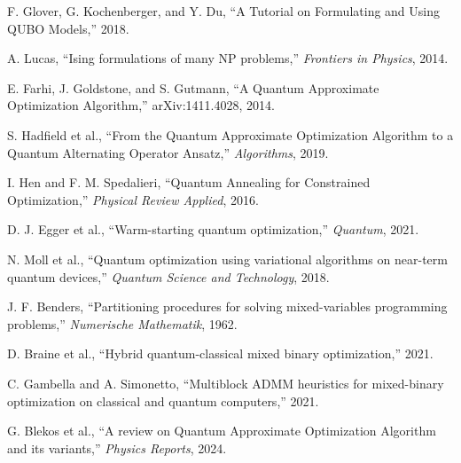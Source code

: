 \documentclass[UTF8,a4paper,11pt]{ctexart}
\begin{document}
\begin{enumerate}[label={[\arabic*]},leftmargin=2.2em]
  \item F. Glover, G. Kochenberger, and Y. Du, ``A Tutorial on Formulating and Using QUBO Models,'' 2018.
  \item A. Lucas, ``Ising formulations of many NP problems,'' \textit{Frontiers in Physics}, 2014.
  \item E. Farhi, J. Goldstone, and S. Gutmann, ``A Quantum Approximate Optimization Algorithm,'' arXiv:1411.4028, 2014.
  \item S. Hadfield et al., ``From the Quantum Approximate Optimization Algorithm to a Quantum Alternating Operator Ansatz,'' \textit{Algorithms}, 2019.
  \item I. Hen and F. M. Spedalieri, ``Quantum Annealing for Constrained Optimization,'' \textit{Physical Review Applied}, 2016.
  \item D. J. Egger et al., ``Warm-starting quantum optimization,'' \textit{Quantum}, 2021.
  \item N. Moll et al., ``Quantum optimization using variational algorithms on near-term quantum devices,'' \textit{Quantum Science and Technology}, 2018.
  \item J. F. Benders, ``Partitioning procedures for solving mixed-variables programming problems,'' \textit{Numerische Mathematik}, 1962.
  \item D. Braine et al., ``Hybrid quantum-classical mixed binary optimization,'' 2021.
  \item C. Gambella and A. Simonetto, ``Multiblock ADMM heuristics for mixed-binary optimization on classical and quantum computers,'' 2021.
  \item G. Blekos et al., ``A review on Quantum Approximate Optimization Algorithm and its variants,'' \textit{Physics Reports}, 2024.
\end{enumerate}
\end{document}
